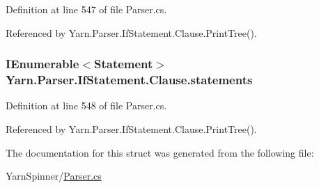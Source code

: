 Definition at line 547 of file Parser.\-cs.



Referenced by Yarn.\-Parser.\-If\-Statement.\-Clause.\-Print\-Tree().

\hypertarget{a00040_a6f4765482e98ed042e38a0ede13f171f}{
\subsubsection[{statements}]{\setlength{\rightskip}{0pt plus 5cm}I\-Enumerable$<${\bf Statement}$>$ Yarn.\-Parser.\-If\-Statement.\-Clause.\-statements\hspace{0.3cm}{\ttfamily [package]}}}\label{a00040_a6f4765482e98ed042e38a0ede13f171f}


Definition at line 548 of file Parser.\-cs.



Referenced by Yarn.\-Parser.\-If\-Statement.\-Clause.\-Print\-Tree().



The documentation for this struct was generated from the following file\-:\begin{DoxyCompactItemize}
\item 
Yarn\-Spinner/\hyperlink{a00295}{Parser.\-cs}\end{DoxyCompactItemize}

